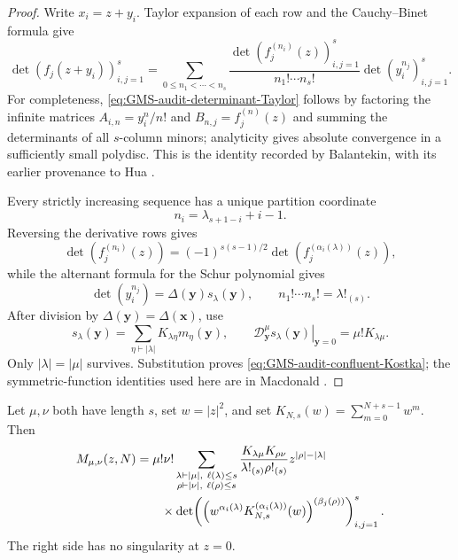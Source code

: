 \begin{proof}
Write $x_i=z+y_i$.  Taylor expansion of each row and the Cauchy--Binet formula give
\begin{equation}
 \det(f_j(z+y_i))_{i,j=1}^{s}
 =\sum_{0\leq n_1<\cdots<n_s}
 \frac{\det(f_j^{(n_i)}(z))_{i,j=1}^{s}}
 {n_1!\cdots n_s!}
 \det(y_i^{n_j})_{i,j=1}^{s}.
 \label{eq:GMS-audit-determinant-Taylor}
\end{equation}
For completeness, \eqref{eq:GMS-audit-determinant-Taylor} follows by factoring the infinite
matrices
$A_{i,n}=y_i^n/n!$ and $B_{n,j}=f_j^{(n)}(z)$ and summing the determinants of all $s$-column
minors; analyticity gives absolute convergence in a sufficiently small polydisc.  This is the
identity recorded by Balantekin, with its earlier provenance to Hua
\cite[App.~B]{balantekin2000}.

Every strictly increasing sequence has a unique partition coordinate
\begin{equation}
 n_i=\lambda_{s+1-i}+i-1.
 \label{eq:GMS-audit-partition-reindex}
\end{equation}
Reversing the derivative rows gives
\begin{equation}
 \det(f_j^{(n_i)}(z))
 =(-1)^{s(s-1)/2}
 \det(f_j^{(\alpha_i(\lambda))}(z)),
\end{equation}
while the alternant formula for the Schur polynomial gives
\begin{equation}
 \det(y_i^{n_j})=\Delta(\mathbf y)s_\lambda(\mathbf y),
 \qquad
 n_1!\cdots n_s!=\lambda!_{(s)}.
 \label{eq:GMS-audit-Schur-alternant}
\end{equation}
After division by $\Delta(\mathbf y)=\Delta(\mathbf x)$, use
\begin{equation}
 s_\lambda(\mathbf y)=\sum_{\eta\vdash|\lambda|}K_{\lambda\eta}m_\eta(\mathbf y),
 \qquad
 \left.\mathcal D_{\mathbf y}^{\mu}s_\lambda(\mathbf y)\right|_{\mathbf y=0}
 =\mu!K_{\lambda\mu}.
 \label{eq:GMS-audit-Schur-monomial}
\end{equation}
Only $|\lambda|=|\mu|$ survives.  Substitution proves
\eqref{eq:GMS-audit-confluent-Kostka}; the symmetric-function identities used here are in
Macdonald \cite[Ch.~I]{macdonald1995}.
\end{proof}

\begin{theorem}
\label{thm:GMS-audit-finite-N}
Let $\mu,\nu$ both have length $s$, set $w=|z|^2$, and set
$K_{N,s}(w)=\sum_{m=0}^{N+s-1}w^m$.  Then
\begin{align}
 M_{\mu,\nu}(z,N)
 &=\mu!\nu!
 \sum_{\substack{\lambda\vdash|\mu|,\ \ell(\lambda)\leq s\\
                   \rho\vdash|\nu|,\ \ell(\rho)\leq s}}
 \frac{K_{\lambda\mu}K_{\rho\nu}}
 {\lambda!_{(s)}\rho!_{(s)}}z^{|\rho|-|\lambda|}\notag\\
 &\qquad\times
 \det\!\left(
 \left(w^{\alpha_i(\lambda)}K_{N,s}^{(\alpha_i(\lambda))}(w)\right)^
 {(\beta_j(\rho))}
 \right)_{i,j=1}^{s}.
 \label{eq:GMS-audit-finite-N}
\end{align}
The right side has no singularity at $z=0$.
\end{theorem}

